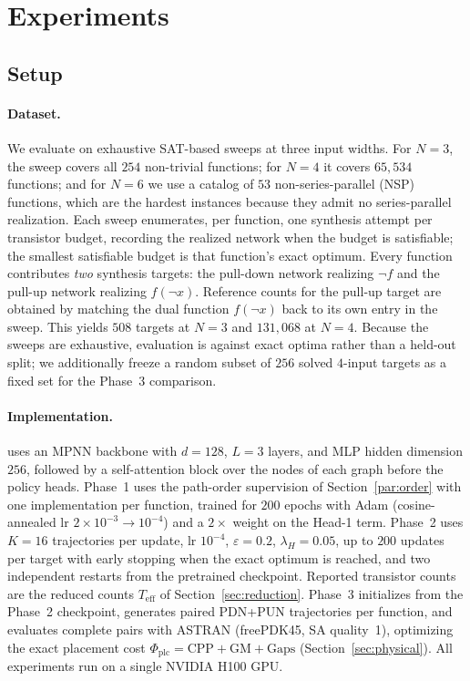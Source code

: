 \section{Experiments}
\label{sec:exp}

\subsection{Setup}

\paragraph{Dataset.}
We evaluate on exhaustive SAT-based sweeps at three input widths.
For $N=3$, the sweep covers all $254$ non-trivial functions; for $N=4$ it
covers $65{,}534$ functions; and for $N=6$ we use a catalog of $53$
non-series-parallel (NSP) functions, which are the hardest instances because
they admit no series-parallel realization.
Each sweep enumerates, per function, one synthesis attempt per transistor
budget, recording the realized network when the budget is satisfiable; the
smallest satisfiable budget is that function's exact optimum.
Every function contributes \emph{two} synthesis targets: the pull-down
network realizing $\neg f$ and the pull-up network realizing $f(\neg x)$.
Reference counts for the pull-up target are obtained by matching the dual
function $f(\neg x)$ back to its own entry in the sweep.
This yields $508$ targets at $N=3$ and $131{,}068$ at $N=4$.
Because the sweeps are exhaustive, evaluation is against exact optima rather
than a held-out split; we additionally freeze a random subset of $256$
solved $4$-input targets as a fixed set for the Phase~3 comparison.

\paragraph{Implementation.}
\method{} uses an MPNN backbone with $d=128$, $L=3$ layers, and MLP hidden
dimension $256$, followed by a self-attention block over the nodes of each
graph before the policy heads.
Phase~1 uses the path-order supervision of Section~\ref{par:order} with one
implementation per function, trained for $200$ epochs with Adam
(cosine-annealed lr $2\times10^{-3}\!\to\!10^{-4}$) and a $2\times$ weight on
the Head-1 term.
Phase~2 uses $K=16$ trajectories per update, lr $10^{-4}$,
$\varepsilon=0.2$, $\lambda_H=0.05$, up to $200$ updates per target with
early stopping when the exact optimum is reached, and two independent
restarts from the pretrained checkpoint.
Reported transistor counts are the reduced counts $T_{\mathrm{eff}}$ of
Section~\ref{sec:reduction}.
Phase~3 initializes from the Phase~2 checkpoint, generates paired PDN+PUN
trajectories per function, and evaluates complete pairs with ASTRAN
(freePDK45, SA quality~1), optimizing the exact placement cost
$\Phi_{\mathrm{plc}}=\mathrm{CPP}+\mathrm{GM}+\mathrm{Gaps}$
(Section~\ref{sec:physical}).
All experiments run on a single NVIDIA H100 GPU.

